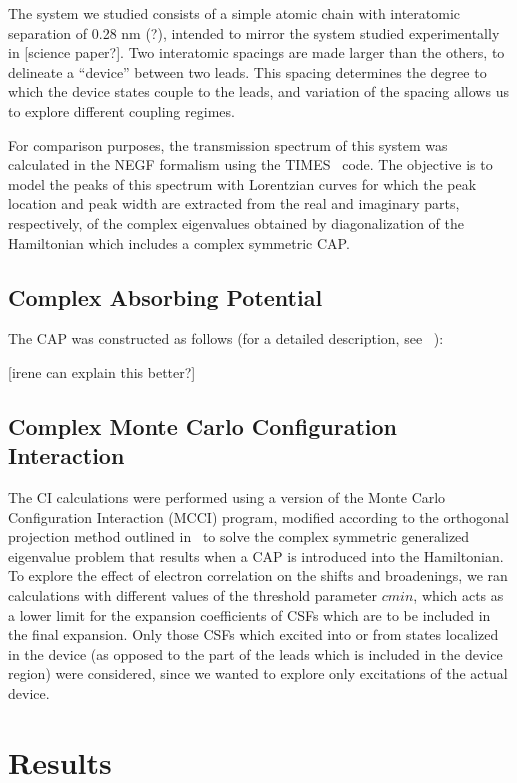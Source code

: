 The system we studied consists of a simple atomic chain with interatomic
separation of 0.28 nm (?), intended to mirror the system studied experimentally
in [science paper?]. Two interatomic spacings are made larger than the others,
to delineate a ``device'' between two leads. This spacing determines the
degree to which the device states couple to the leads, and variation of the
spacing allows us to explore different coupling regimes.

For comparison purposes, the transmission spectrum of this system was
calculated in the NEGF formalism using the TIMES~\cite{times} code. The
objective is to model the peaks of this spectrum with Lorentzian curves for
which the peak location and peak width are extracted from the real and
imaginary parts, respectively, of the complex eigenvalues obtained by
diagonalization of the Hamiltonian which includes a complex symmetric CAP.

\subsection{Complex Absorbing Potential}
\label{subsec:CAP}

The CAP was constructed as follows (for a detailed description, see~
\cite{henderson}):

[irene can explain this better?]

\subsection{Complex Monte Carlo Configuration Interaction}

The CI calculations were performed using a version of the Monte Carlo
Configuration Interaction (MCCI) program, modified according to the orthogonal
projection method outlined in~\cite{tarantelli_csd} to solve the complex
symmetric generalized eigenvalue problem that results when a CAP is introduced
into the Hamiltonian. To explore the effect of electron correlation on the
shifts and broadenings, we ran calculations with different values of the
threshold parameter $cmin$, which acts as a lower limit for the expansion
coefficients of CSFs which are to be included in the final expansion. Only
those CSFs which excited into or from states localized in the device (as
opposed to the part of the leads which is included in the device region) were
considered, since we wanted to explore only excitations of the actual device.

\section{Results}
\label{sec:results}

